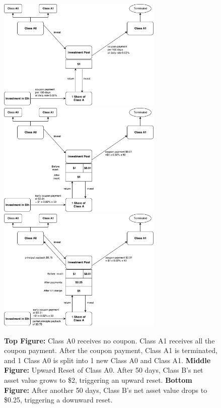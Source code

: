 \documentclass[draft, noinfoline]{ectaart}
\numberwithin{equation}{section}
\theoremstyle{plain}
\begin{document}
\begin{appendices}
\begin{figure}[p]
\centering
	\includegraphics[width=0.7\textwidth]{A0_periodic}
	\vspace{1em}
	\includegraphics[width=0.7\textwidth]{A0_upward}
	\vspace{1em}
	\includegraphics[width=0.7\textwidth]{A0_downward}
	\caption{{\bf Top Figure:} Class A0 receives no coupon.  Class A1 receives all the coupon payment. After the coupon payment, Class A1 is terminated, and 1 Class A0 is split into 1 new Class A0 and Class A1. {\bf Middle Figure:} Upward Reset of Class A0. After 50 days, Class B's net asset value grows to \$2, triggering an upward reset. {\bf Bottom Figure:} After another 50 days, Class B's net asset value drops to \$0.25, triggering a downward reset. }\label{fig:A0}
\end{figure}


\end{appendices}
\end{document}
